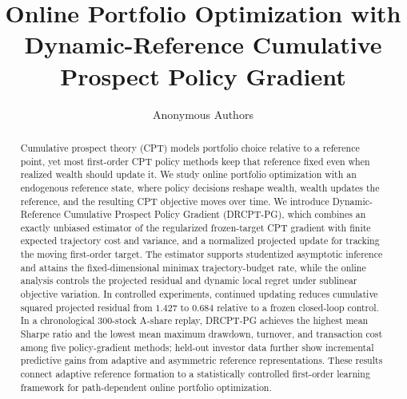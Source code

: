 \documentclass[11pt]{article}
\title{Online Portfolio Optimization with Dynamic-Reference Cumulative Prospect Policy Gradient}
\author{Anonymous Authors}
\date{}
\newcommand{\1}{\mathbf 1}
\begin{document}
\maketitle

\begin{abstract}
Cumulative prospect theory (CPT) models portfolio choice relative to a reference point, yet most first-order CPT policy methods keep that reference fixed even when realized wealth should update it.  We study online portfolio optimization with an endogenous reference state, where policy decisions reshape wealth, wealth updates the reference, and the resulting CPT objective moves over time.  We introduce Dynamic-Reference Cumulative Prospect Policy Gradient (DRCPT-PG), which combines an exactly unbiased estimator of the regularized frozen-target CPT gradient with finite expected trajectory cost and variance, and a normalized projected update for tracking the moving first-order target.  The estimator supports studentized asymptotic inference and attains the fixed-dimensional minimax trajectory-budget rate, while the online analysis controls the projected residual and dynamic local regret under sublinear objective variation.  In controlled experiments, continued updating reduces cumulative squared projected residual from $1.427$ to $0.684$ relative to a frozen closed-loop control.  In a chronological 300-stock A-share replay, DRCPT-PG achieves the highest mean Sharpe ratio and the lowest mean maximum drawdown, turnover, and transaction cost among five policy-gradient methods; held-out investor data further show incremental predictive gains from adaptive and asymmetric reference representations.  These results connect adaptive reference formation to a statistically controlled first-order learning framework for path-dependent online portfolio optimization.
\end{abstract}
















\clearpage
\appendix





\end{document}
